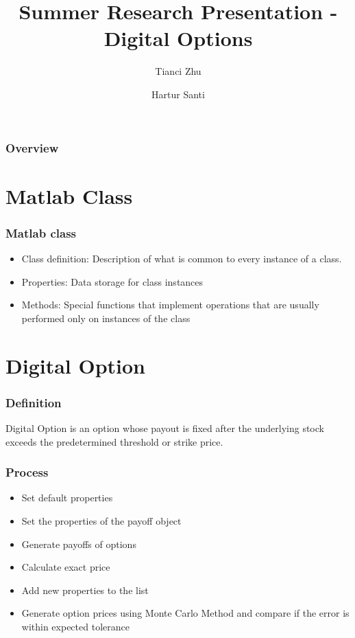 \documentclass[10pt,Compress]{beamer}
\title[Options]{\huge{Summer Research Presentation - Digital Options}}
\author{Tianci Zhu \and Hartur Santi}
\institute[IIT]{Illinois Institute of Technology}
\begin{document}
\titlepage


\begin{frame}
\frametitle{Overview}
\tableofcontents
\end{frame}

\section{Matlab Class}
\begin{frame}
\frametitle{Matlab class}
\begin{itemize}
\item Class definition: Description of what is common to every instance of a class.
\item Properties: Data storage for class instances
\item Methods: Special functions that implement operations that are usually performed only on instances of the class
\end{itemize}
\end{frame}


\section{Digital Option}
\begin{frame}
\frametitle{Definition}
Digital Option is an option whose payout is fixed after the underlying stock exceeds the predetermined threshold or strike price. 
\end{frame}

\begin{frame}
\frametitle{Process}
\begin{itemize}
\item Set default properties
\item Set the properties of the payoff object
\item Generate payoffs of options
\item Calculate exact price
\item Add new properties to the list 
\item Generate option prices using Monte Carlo Method and compare if the error is within expected tolerance
\end{itemize}
\end{frame}
\end{document}

